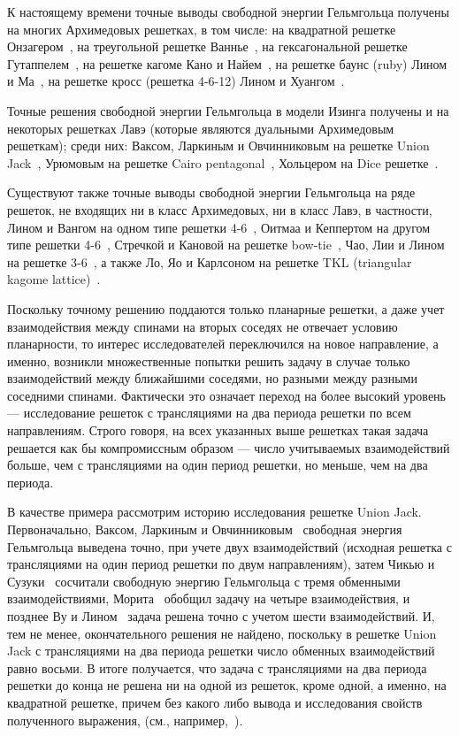 \documentclass[utf8,12pt]{jetp}
\begin{document}
К настоящему времени точные выводы свободной энергии Гельмгольца получены на многих Архимедовых  решетках, в том числе: на квадратной решетке Онзагером~\cite{onsager1941}, на треугольной решетке Ваннье~\cite{wannier1950}, на гексагональной решетке Гутаппелем~\cite{houtapell1950}, на решетке кагоме Кано и Найем~\cite{kano_naya1953}, на решетке баунс (ruby) Лином и Ма~\cite{lin1983}, на решетке кросс (решетка 4-6-12) Лином и Хуангом~\cite{lin1985}. 

Точные решения свободной энергии Гельмгольца в модели Изинга получены и на некоторых решетках Лавэ (которые являются дуальными Архимедовым  решеткам); среди них: Ваксом, Ларкиным и Овчинниковым на решетке Union Jack~\cite{vaks1965}, Урюмовым на решетке Cairo pentagonal~\cite{urumov2002}, Хольцером на Dice решетке~\cite{holzer1990}.

Существуют также точные выводы свободной энергии Гельмгольца на ряде решеток, не входящих ни в класс Архимедовых, ни в класс Лавэ, в частности, Лином и Вангом на одном типе решетки 4-6~\cite{lin1988}, Оитмаа и Кеппертом на другом типе решетки 4-6~\cite{oitmaa2002}, Стречкой и Кановой на решетке bow-tie~\cite{strecka2008}, Чао, Лии и Лином на решетке 3-6~\cite{chao1990}, а также Ло, Яо и Карлсоном на решетке TKL (triangular kagome lattice)~\cite{loh2008}.

Поскольку точному решению поддаются только планарные решетки, а даже учет взаимодействия между спинами на вторых соседях не отвечает условию планарности, то интерес исследователей переключился на новое направление, а именно, возникли множественные попытки решить задачу в случае только взаимодействий между ближайшими соседями, но разными между разными соседними спинами. Фактически это означает переход на более высокий уровень — исследование решеток с трансляциями на два периода решетки по всем направлениям. Строго говоря, на всех указанных выше решетках такая задача решается как бы компромиссным образом — число учитываемых взаимодействий больше, чем с трансляциями на один период решетки, но меньше, чем на два периода. 

В качестве примера рассмотрим историю исследования решетке Union Jack. Первоначально, Ваксом, Ларкиным и Овчинниковым~\cite{vaks1965} свободная энергия Гельмгольца выведена точно, при учете двух взаимодействий (исходная решетка с трансляциями на один период решетки по двум направлениям), затем Чикью и Сузуки~\cite{chikyu1987} сосчитали свободную энергию Гельмгольца с тремя обменными взаимодействиями, Морита~\cite{morita1986} обобщил задачу на четыре взаимодействия, и позднее Ву и Лином~\cite{wu1987} задача решена точно с учетом шести взаимодействий. И, тем не менее, окончательного решения не найдено, поскольку в решетке Union Jack с трансляциями на два периода решетки число обменных взаимодействий равно восьми. В итоге получается, что задача с трансляциями на два периода решетки до конца не решена ни на одной из решеток, кроме одной, а именно, на квадратной решетке, причем без какого либо вывода и исследования свойств полученного выражения, (см., например,~\cite{syozi1972, utiyama1951}).
\end{document}
